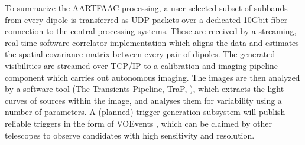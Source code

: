 \documentclass{ws-jai}
\begin{document}

To summarize  the AARTFAAC processing, a  user selected subset of  subbands from
every  dipole is  transferred  as  UDP packets  over  a  dedicated 10Gbit  fiber
connection  to  the  central  processing  systems.   These  are  received  by  a
streaming, real-time  software correlator  implementation which aligns  the data
and estimates the spatial covariance matrix  between every pair of dipoles.  The
generated visibilities  are streamed  over TCP/IP to  a calibration  and imaging
pipeline component  which carries out  autonomous imaging.  The images  are then
analyzed    by   a    software    tool   (The    Transients   Pipeline,    TraP,
\citep{swinbank2015lofar}), which  extracts the  light curves of  sources within
the image,  and analyses them for  variability using a number  of parameters.  A
(planned) trigger  generation subsystem  will publish  reliable triggers  in the
form  of VOEvents  \cite{williams2006voevent},  which can  be  claimed by  other
telescopes to observe candidates with high sensitivity and resolution.
\end{document}
